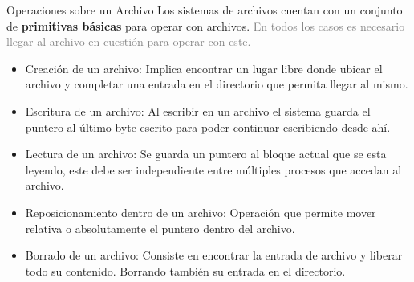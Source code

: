 \documentclass[aspectratio=169]{beamer}
\begin{document}
\begin{frame}[fragile,t]{Operaciones sobre un Archivo}
    Los sistemas de archivos cuentan con un conjunto de \textbf{primitivas básicas} para operar con archivos.
    \textcolor{gray}{En todos los casos es necesario llegar al archivo en cuestión para operar con este.}
    \begin{itemize}
    \pause
    \setlength\itemsep{0.3cm}
    \item \textcolor{naranjauca}{Creación de un archivo:}
    Implica encontrar un lugar libre donde ubicar el archivo y completar una entrada en el directorio que permita llegar al mismo.
    \pause
    \item \textcolor{naranjauca}{Escritura de un archivo:}
    Al escribir en un archivo el sistema guarda el puntero al último byte escrito para poder continuar escribiendo desde ahí.
    \pause
    \item \textcolor{naranjauca}{Lectura de un archivo:} Se guarda un puntero al bloque actual que se esta leyendo, este debe ser independiente entre múltiples procesos que accedan al archivo.
    \pause
    \item \textcolor{naranjauca}{Reposicionamiento dentro de un archivo:}
    Operación que permite mover relativa o absolutamente el puntero dentro del archivo.
    \pause
    \item \textcolor{naranjauca}{Borrado de un archivo:} Consiste en encontrar la entrada de archivo y liberar todo su contenido. Borrando también su entrada en el directorio.
    \end{itemize}
\end{frame}
\end{document}
